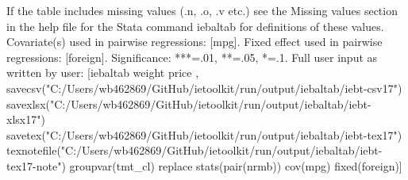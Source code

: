 If the table includes missing values (.n, .o, .v etc.) see the Missing values section in the help file for the Stata command iebaltab for definitions of these values. Covariate(s) used in pairwise regressions: [mpg]. Fixed effect used in pairwise regressions: [foreign]. Significance: ***=.01, **=.05, *=.1. Full user input as written by user: [iebaltab weight price , savecsv("C:/Users/wb462869/GitHub/ietoolkit/run/output/iebaltab/iebt-csv17") savexlsx("C:/Users/wb462869/GitHub/ietoolkit/run/output/iebaltab/iebt-xlsx17") savetex("C:/Users/wb462869/GitHub/ietoolkit/run/output/iebaltab/iebt-tex17") texnotefile("C:/Users/wb462869/GitHub/ietoolkit/run/output/iebaltab/iebt-tex17-note") groupvar(tmt\_cl) replace stats(pair(nrmb)) cov(mpg) fixed(foreign)] 

